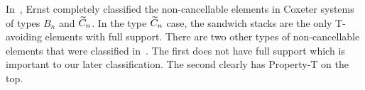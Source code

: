 In~\cite{Ernst2010}, Ernst completely classified the non-cancellable elements in Coxeter systems of types $B_n$ and $\widetilde{C}_n$. In the type $\widetilde{C}_n$ case, the sandwich stacks are the only T-avoiding elements with full support. There are two other types of non-cancellable elements that were classified in~\cite{Ernst2010}. The first does not have full support which is important to our later classification. The second clearly has Property-T on the top.


%
%	
%	
%
%	
%	

